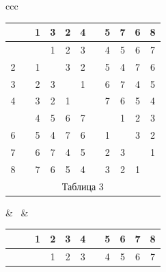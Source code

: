 \begin{center}


\begin{tabular}{ccc}  %





\begin{tabular}{ccccccccccc}  %


\ & \vline & 1 & 3 & 2 & 4 & \vline & 5 & 7 & 6 & 8 \\


\hline


 1 & \vline & \ & 1 & 2 & 3 & \vline & 4 & 5 & 6 & 7 \\


2 & \vline & 1 & \ & 3 & 2 & \vline & 5 & 4 & 7 & 6 \\


3 & \vline & 2 & 3 & \ & 1 & \vline & 6 & 7 & 4 & 5 \\


4 & \vline & 3 & 2 & 1 & \ & \vline & 7 & 6 & 5 & 4 \\


\hline


 5 & \vline & 4 & 5 & 6 & 7 & \vline & \ & 1 & 2 & 3 \\


6 & \vline & 5 & 4 & 7 & 6 & \vline & 1 & \ & 3 & 2 \\


7 & \vline & 6 & 7 & 4 & 5 & \vline & 2 & 3 & \ & 1 \\


8 & \vline & 7 & 6 & 5 & 4 & \vline & 3 & 2 & 1 & \ \\


\multicolumn{11}{c}{ Таблица 3}


\end{tabular}





& \ & 





\begin{tabular}{ccccccccccc}


\ & \vline & 1 & 2 & 3 & 4 & \vline & 5 & 6 & 7 & 8 \\


\hline


 1 & \vline & \ & 1 & 2 & 3 & \vline & 4 & 5 & 6 & 7 \\



\end{tabular}
\end{tabular}
\end{center}
